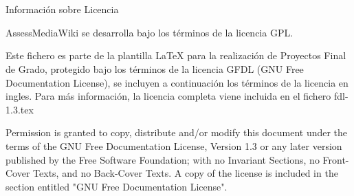 


\chapter*{}

 \begin{center}

       Información sobre Licencia


\end{center}

AssessMediaWiki se desarrolla bajo los términos de la licencia GPL.
\newline

Este fichero es parte de la plantilla LaTeX para la realización de Proyectos Final de Grado, protegido bajo los términos de la licencia GFDL (GNU Free Documentation License), se incluyen a continuación los términos de la licencia en ingles. Para más información, la licencia completa viene incluida en el fichero fdl-1.3.tex
\newline

Permission is granted to copy, distribute and/or modify this document under the terms of the GNU Free Documentation License, Version 1.3 or any later version published by the Free Software Foundation; with no Invariant Sections, no Front-Cover Texts, and no Back-Cover Texts. A copy of the license is included in the section entitled "GNU Free Documentation License".